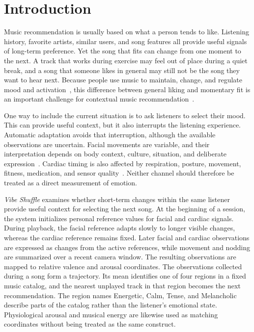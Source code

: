 \section{Introduction}

Music recommendation is usually based on what a person tends to like.
Listening history, favorite artists, similar users, and song features all
provide useful signals of long-term preference. Yet the song that fits can
change from one moment to the next. A track that works during exercise may feel
out of place during a quiet break, and a song that someone likes in general may
still not be the song they want to hear next. Because people use music to
maintain, change, and regulate mood and activation~\cite{juslin2008,schaefer2013},
this difference between general liking and momentary fit is an important
challenge for contextual music recommendation~\cite{kaminskas2012,schedl2018}.

One way to include the current situation is to ask listeners to select their
mood. This can provide useful context, but it also interrupts the listening
experience. Automatic adaptation avoids that interruption, although the
available observations are uncertain. Facial movements are variable, and their
interpretation depends on body context, culture, situation, and deliberate
expression~\cite{aviezer2012,barrett2019,kuppens2017}. Cardiac timing is also
affected by respiration, posture, movement, fitness, medication, and sensor
quality~\cite{laborde2017,quigley2024,shaffer2017}. Neither channel should
therefore be treated as a direct measurement of emotion.

\emph{Vibe Shuffle} examines whether short-term changes within the same listener
provide useful context for selecting the next song. At the
beginning of a session, the system initializes personal reference values for
facial and cardiac signals. During playback, the facial reference
adapts slowly to longer visible changes, whereas the cardiac reference remains
fixed. Later facial and cardiac observations are expressed as changes from the
active references, while movement and nodding are summarized over a recent
camera window. The resulting observations are mapped to relative valence and
arousal coordinates. The
observations collected during a song form a trajectory. Its mean identifies one of four
regions in a fixed music catalog, and the nearest unplayed track in that region
becomes the next recommendation. The region names Energetic, Calm, Tense, and
Melancholic describe parts of the catalog rather than the listener's emotional
state. Physiological arousal and musical energy are likewise used as matching
coordinates without being treated as the same construct.

